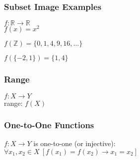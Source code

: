 \documentclass[dvipsnames]{beamer}
\begin{document}
\begin{frame}
  \frametitle{Subset Image Examples}

  $f: \mathbb{R} \rightarrow \mathbb{R}$\\
  $f(x) = x^2$

  \pause
  \bigskip
  $f(\mathbb{Z}) = \{0,1,4,9,16,\dots\}$

  \medskip
  $f(\{-2,1\}) = \{1,4\}$
\end{frame}

\begin{frame}
  \frametitle{Range}

  \begin{definition}
    $f: X \rightarrow Y$\\
    \alert{range}: $f(X)$
  \end{definition}
\end{frame}

\begin{frame}
  \frametitle{One-to-One Functions}

  \begin{definition}
    $f: X \rightarrow Y$ is \alert{one-to-one} (or \alert{injective}):\\
      $\forall x_1,x_2 \in X~[f(x_1)=f(x_2) \rightarrow x_1=x_2]$
  \end{definition}
\end{frame}
\end{document}
